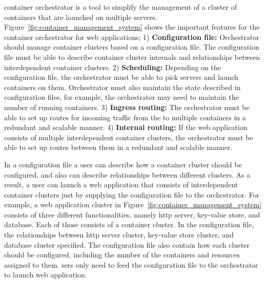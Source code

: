  container orchestrator is a tool to simplify the management of a cluster of containers that are launched on multiple servers.
%
%
Figure~\ref{fig:container_management_system} shows the important features for the container orchestrator for web applications;
1) {\bf Configuration file:} Orchestrator should manage container clusters based on a configuration file. 
The configuration file must be able to describe container cluster internals and relationships between interdependent container clusters.
2) {\bf Scheduling:} Depending on the configuration file, the orchestrator must be able to pick servers and launch containers on them.
Orchestrator must also maintain the state described in configuration files, for example, the orchestrator may need to maintain the number of running containers.
3) {\bf Ingress routing:} The orchestrator must be able to set up routes for incoming traffic from the  to multiple containers in a redundant and scalable manner.
4) {\bf Internal routing:} If the web application consists of multiple interdependent container clusters, the orchestrator must be able to set up routes between them in a redundant and scalable manner.

In a configuration file a user can describe how a container cluster should be configured, and also can describe relationships between different  clusters.
As a result, a user can launch a web application that consists of interdependent container clusters just by supplying the configuration file to the orchestrator.
For example, a web application cluster in Figure~\ref{fig:container_management_system} consists of three different functionalities, namely http server, key-value store, and database.
Each of those consists of a container cluster.
In the configuration file, the relationships between  http server cluster,  key-value store cluster, and  database cluster  specified.
The configuration file  also contain how each cluster should be configured, including the number of the containers and resources assigned to them.
sers only need to feed the configuration file to the orchestrator to launch  web application.

